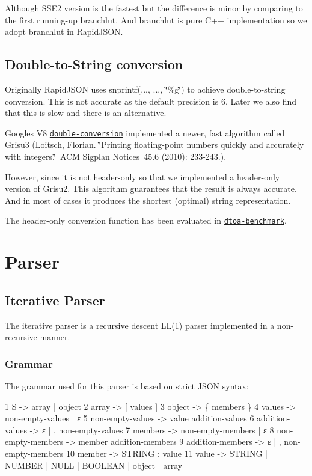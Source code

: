 Although S\+S\+E2 version is the fastest but the difference is minor by comparing to the first running-\/up {\ttfamily branchlut}. And {\ttfamily branchlut} is pure C++ implementation so we adopt {\ttfamily branchlut} in Rapid\+J\+S\+ON.\hypertarget{md_Cadriciel_Commun_Externe_RapidJSON_doc_internals_dtoa}{}\subsection{Double-\/to-\/\+String conversion}\label{md_Cadriciel_Commun_Externe_RapidJSON_doc_internals_dtoa}
Originally Rapid\+J\+S\+ON uses {\ttfamily snprintf(..., ..., \char`\"{}\%g\char`\"{})} to achieve double-\/to-\/string conversion. This is not accurate as the default precision is 6. Later we also find that this is slow and there is an alternative.

Google\textquotesingle{}s V8 \href{https://github.com/floitsch/double-conversion}{\tt double-\/conversion} implemented a newer, fast algorithm called Grisu3 (Loitsch, Florian. \char`\"{}\+Printing floating-\/point numbers quickly and accurately with integers.\char`\"{} \+A\+CM Sigplan Notices 45.6 (2010)\+: 233-\/243.).

However, since it is not header-\/only so that we implemented a header-\/only version of Grisu2. This algorithm guarantees that the result is always accurate. And in most of cases it produces the shortest (optimal) string representation.

The header-\/only conversion function has been evaluated in \href{https://github.com/miloyip/dtoa-benchmark}{\tt dtoa-\/benchmark}.\hypertarget{md_Cadriciel_Commun_Externe_RapidJSON_doc_internals_Parser}{}\section{Parser}\label{md_Cadriciel_Commun_Externe_RapidJSON_doc_internals_Parser}
\hypertarget{md_Cadriciel_Commun_Externe_RapidJSON_doc_internals_IterativeParser}{}\subsection{Iterative Parser}\label{md_Cadriciel_Commun_Externe_RapidJSON_doc_internals_IterativeParser}
The iterative parser is a recursive descent L\+L(1) parser implemented in a non-\/recursive manner.\hypertarget{md_Cadriciel_Commun_Externe_RapidJSON_doc_internals_IterativeParserGrammar}{}\subsubsection{Grammar}\label{md_Cadriciel_Commun_Externe_RapidJSON_doc_internals_IterativeParserGrammar}
The grammar used for this parser is based on strict J\+S\+ON syntax\+: 
\begin{DoxyCode}
1 S -> array | object
2 array -> [ values ]
3 object -> \{ members \}
4 values -> non-empty-values | ε
5 non-empty-values -> value addition-values
6 addition-values -> ε | , non-empty-values
7 members -> non-empty-members | ε
8 non-empty-members -> member addition-members
9 addition-members -> ε | , non-empty-members
10 member -> STRING : value
11 value -> STRING | NUMBER | NULL | BOOLEAN | object | array
\end{DoxyCode}


